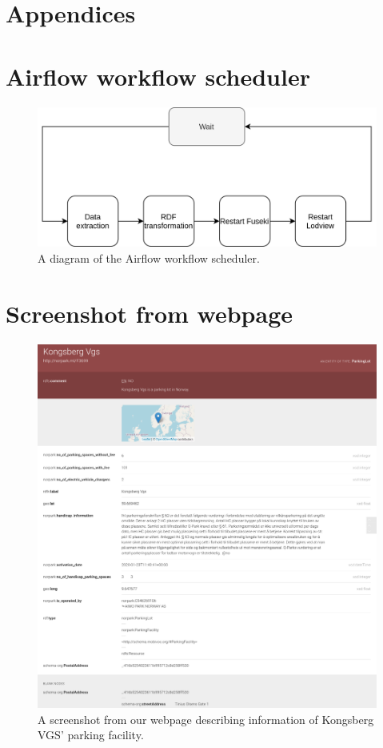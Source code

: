 \chapter*{Appendices}
\appendix

\chapter{Airflow workflow scheduler}
\label{appendix:airflow}

\begin{figure}
	\centering
	\includegraphics[scale=0.25]{figures/airflow.png}
	\caption{A diagram of the Airflow workflow scheduler.}
\end{figure}

\chapter{Screenshot from webpage}
\label{appendix:webpage}

\begin{figure}
	\centering
	\includegraphics[scale=0.25]{figures/webpage.png}
	\caption{A screenshot from our webpage describing information of Kongsberg VGS' parking facility.}
\end{figure}
